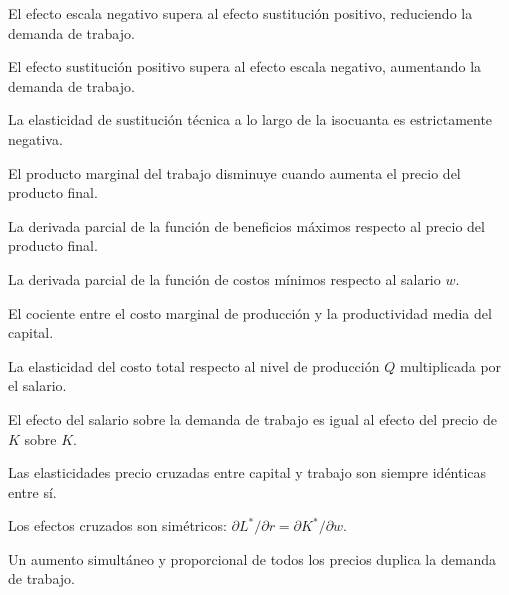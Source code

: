 \begin{opts}
    \item El efecto escala negativo supera al efecto sustitución positivo, reduciendo la demanda de trabajo.
    \item El efecto sustitución positivo supera al efecto escala negativo, aumentando la demanda de trabajo.
    \item La elasticidad de sustitución técnica a lo largo de la isocuanta es estrictamente negativa.
    \item El producto marginal del trabajo disminuye cuando aumenta el precio del producto final.
\end{opts}

\begin{opts}
    \item La derivada parcial de la función de beneficios máximos respecto al precio del producto final.
    \item La derivada parcial de la función de costos mínimos respecto al salario $w$.
    \item El cociente entre el costo marginal de producción y la productividad media del capital.
    \item La elasticidad del costo total respecto al nivel de producción $Q$ multiplicada por el salario.
\end{opts}

\begin{opts}
    \item El efecto del salario sobre la demanda de trabajo es igual al efecto del precio de $K$ sobre $K$.
    \item Las elasticidades precio cruzadas entre capital y trabajo son siempre idénticas entre sí.
    \item Los efectos cruzados son simétricos: $\partial L^*/\partial r = \partial K^*/\partial w$.
    \item Un aumento simultáneo y proporcional de todos los precios duplica la demanda de trabajo.
\end{opts}

